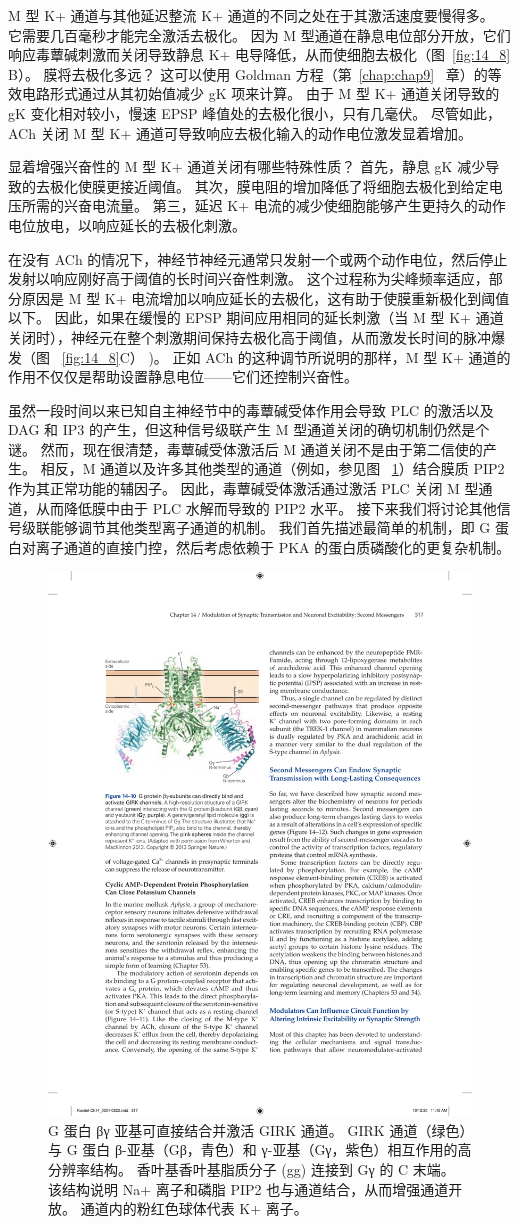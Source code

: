 M 型 K+ 通道与其他延迟整流 K+ 通道的不同之处在于其激活速度要慢得多。
它需要几百毫秒才能完全激活去极化。
因为 M 型通道在静息电位部分开放，它们响应毒蕈碱刺激而关闭导致静息 K+ 电导降低，从而使细胞去极化（图~\ref{fig:14_8} B）。
膜将去极化多远？
这可以使用 Goldman 方程（第~\ref{chap:chap9} ~章）的等效电路形式通过从其初始值减少 gK 项来计算。
由于 M 型 K+ 通道关闭导致的 gK 变化相对较小，慢速 EPSP 峰值处的去极化很小，只有几毫伏。
尽管如此，ACh 关闭 M 型 K+ 通道可导致响应去极化输入的动作电位激发显着增加。


显着增强兴奋性的 M 型 K+ 通道关闭有哪些特殊性质？
首先，静息 gK 减少导致的去极化使膜更接近阈值。
其次，膜电阻的增加降低了将细胞去极化到给定电压所需的兴奋电流量。
第三，延迟 K+ 电流的减少使细胞能够产生更持久的动作电位放电，以响应延长的去极化刺激。


在没有 ACh 的情况下，神经节神经元通常只发射一个或两个动作电位，然后停止发射以响应刚好高于阈值的长时间兴奋性刺激。
这个过程称为尖峰频率适应，部分原因是 M 型 K+ 电流增加以响应延长的去极化，这有助于使膜重新极化到阈值以下。
因此，如果在缓慢的 EPSP 期间应用相同的延长刺激（当 M 型 K+ 通道关闭时），神经元在整个刺激期间保持去极化高于阈值，从而激发长时间的脉冲爆发（图 ~\ref{fig:14_8}C） )。
正如 ACh 的这种调节所说明的那样，M 型 K+ 通道的作用不仅仅是帮助设置静息电位——它们还控制兴奋性。


虽然一段时间以来已知自主神经节中的毒蕈碱受体作用会导致 PLC 的激活以及 DAG 和 IP3 的产生，但这种信号级联产生 M 型通道关闭的确切机制仍然是个谜。
然而，现在很清楚，毒蕈碱受体激活后 M 通道关闭不是由于第二信使的产生。
相反，M 通道以及许多其他类型的通道（例如，参见图 ~\ref{fig:14_10}）结合膜质 PIP2 作为其正常功能的辅因子。
因此，毒蕈碱受体激活通过激活 PLC 关闭 M 型通道，从而降低膜中由于 PLC 水解而导致的 PIP2 水平。
接下来我们将讨论其他信号级联能够调节其他类型离子通道的机制。
我们首先描述最简单的机制，即 G 蛋白对离子通道的直接门控，然后考虑依赖于 PKA 的蛋白质磷酸化的更复杂机制。


\begin{figure}[htbp]
	\centering
	\includegraphics[width=0.5\linewidth]{chap14/fig_14_10}
	\caption{G 蛋白 βγ 亚基可直接结合并激活 GIRK 通道。 GIRK 通道（绿色）与 G 蛋白 β-亚基（Gβ，青色）和 γ-亚基（Gγ，紫色）相互作用的高分辨率结构。
		香叶基香叶基脂质分子 (gg) 连接到 Gγ 的 C 末端。
		该结构说明 Na+ 离子和磷脂 PIP2 也与通道结合，从而增强通道开放。
		通道内的粉红色球体代表 K+ 离子\cite{whorton2013x}。}
	\label{fig:14_10}
\end{figure}



